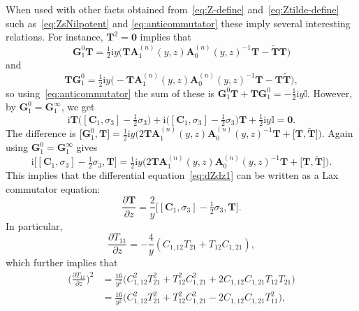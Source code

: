 \documentclass[pdftex]{sigma}
\numberwithin{equation}{section}
\begin{document}
When used with other facts obtained from~\eqref{eq:Z-define} and~\eqref{eq:Ztilde-define} such as~\eqref{eq:ZsNilpotent} and \eqref{eq:anticommutator}
these imply several interesting relations. For instance, $\mathbf{T}^2=\mathbf{0}$ implies that
\begin{equation*}
\mathbf{G}_1^0\mathbf{T}=\tfrac{1}{2}\mathrm{i} y\bigl(\mathbf{T}\mathbf{A}_1^{(n)}(y,z)\mathbf{A}_0^{(n)}(y,z)^{-1}\mathbf{T}-\widetilde{\mathbf{T}}\mathbf{T}\bigr)
\end{equation*}
and
\begin{equation*}
\mathbf{T}\mathbf{G}_1^0=\tfrac{1}{2}\mathrm{i} y\bigl(-\mathbf{T}\mathbf{A}_1^{(n)}(y,z)\mathbf{A}_0^{(n)}(y,z)^{-1}\mathbf{T}-\mathbf{T}\widetilde{\mathbf{T}}\bigr),
\end{equation*}
so using~\eqref{eq:anticommutator} the sum of these is $\mathbf{G}_1^0\mathbf{T}+\mathbf{T}\mathbf{G}_1^0=-\tfrac{1}{2}\mathrm{i} y\mathbb{I}$. However, by $\mathbf{G}_1^0=\mathbf{G}_1^\infty$, we get
\begin{equation}
\mathrm{i}\mathbf{T}\bigl([\mathbf{C}_1,\sigma_3]-\tfrac{1}{2}\sigma_3\bigr)+\mathrm{i}\bigl([\mathbf{C}_1,\sigma_3]-\tfrac{1}{2}\sigma_3\bigr)\mathbf{T}+\tfrac{1}{2}\mathrm{i} y\mathbb{I}=\mathbf{0}.
\label{eq:one-identity}
\end{equation}
The difference is $\big[\mathbf{G}_1^0,\mathbf{T}\big] = \tfrac{1}{2}\mathrm{i} y\bigl(2\mathbf{T}\mathbf{A}_1^{(n)}(y,z)\mathbf{A}_0^{(n)}(y,z)^{-1}\mathbf{T}+\big[\mathbf{T},\widetilde{\mathbf{T}}\big]\bigr)$. Again using $\mathbf{G}_1^0=\mathbf{G}_1^\infty$ gives
\begin{equation*}
\mathrm{i}\big[[\mathbf{C}_1,\sigma_3]-\tfrac{1}{2}\sigma_3,\mathbf{T}\big]=\tfrac{1}{2}\mathrm{i} y\bigl(2\mathbf{T}\mathbf{A}_1^{(n)}(y,z)\mathbf{A}_0^{(n)}(y,z)^{-1}\mathbf{T}+\big[\mathbf{T},\widetilde{\mathbf{T}}\big]\bigr).
\end{equation*}
This implies that the differential equation~\eqref{eq:dZdz1} can be written as a Lax commutator equation:
\begin{equation*}
\frac{\partial\mathbf{T}}{\partial z}=\frac{2}{y}\big[[\mathbf{C}_1,\sigma_3]-\tfrac{1}{2}\sigma_3,\mathbf{T}\big].
\label{eq:dZdz2}
\end{equation*}
In particular,
\begin{equation*}
\frac{\partial T_{11}}{\partial z}=-\frac{4}{y}(C_{1,12}T_{21}+T_{12}C_{1,21}),
\label{eq:dZ11dz}
\end{equation*}
which further implies that
\begin{align}
\bigg(\frac{\partial T_{11}}{\partial z}\bigg)^2 &= \frac{16}{y^2}\bigl(C_{1,12}^2T_{21}^2 + T_{12}^2C_{1,21}^2 + 2C_{1,12}C_{1,21}T_{12}T_{21}\bigr) \nonumber\\
&=\frac{16}{y^2}\bigl(C_{1,12}^2T_{21}^2 + T_{12}^2C_{1,21}^2-2C_{1,12}C_{1,21}T_{11}^2\bigr),\label{eq:FirstOrderSecondDegree1}
\end{align}
\end{document}
